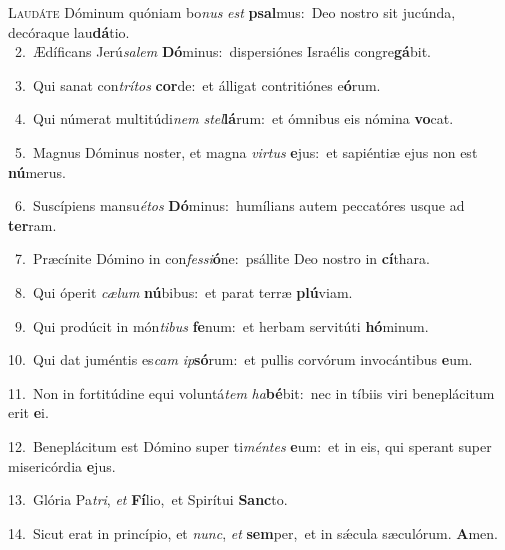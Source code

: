 \lettrine{\initial\textcolor{\initialcolor}{L}}{audáte} Dóminum quóniam bo\textit{nus} \textit{est} \textbf{psal}\-mus:~\star Deo nostro sit jucúnda, decóraque lau\-\textbf{dá}\-tio.\\
{\numbfont\textcolor{\numbcolor}{~2.}}~Ædíficans Jerú\-\textit{sa}\-\textit{lem} \textbf{Dó}\-minus:~\star dispersiónes Israélis congre\-\textbf{gá}\-bit.\par
{\numbfont\textcolor{\numbcolor}{~3.}}~Qui sanat con\-\textit{trí}\-\textit{tos} \textbf{cor}\-de:~\star et álligat contritiónes e\-\textbf{ó}\-rum.\par
{\numbfont\textcolor{\numbcolor}{~4.}}~Qui númerat multitúdi\textit{nem} \textit{stel}\-\textbf{lá}rum:~\star et ómnibus eis nómina \textbf{vo}\-cat.\par
{\numbfont\textcolor{\numbcolor}{~5.}}~Magnus Dóminus noster, et magna \textit{vir}\-\textit{tus} \textbf{e}\-jus:~\star et sapiéntiæ ejus non est \textbf{nú}\-merus.\par
{\numbfont\textcolor{\numbcolor}{~6.}}~Suscípiens mansu\-\textit{é}\-\textit{tos} \textbf{Dó}\-minus:~\star humílians autem peccatóres usque ad \textbf{ter}\-ram.\par
{\numbfont\textcolor{\numbcolor}{~7.}}~Præcínite Dómino in con\-\textit{fes}\-\textit{si}\textbf{ó}ne:~\star psállite Deo nostro in \textbf{cí}\-thara.\par
{\numbfont\textcolor{\numbcolor}{~8.}}~Qui óperit \textit{cæ}\-\textit{lum} \textbf{nú}\-bibus:~\star et parat terræ \textbf{plú}\-viam.\par
{\numbfont\textcolor{\numbcolor}{~9.}}~Qui prodúcit in món\-\textit{ti}\-\textit{bus} \textbf{fe}\-num:~\star et herbam servitúti \textbf{hó}\-minum.\par
{\numbfont\textcolor{\numbcolor}{10.}}~Qui dat juméntis es\textit{cam} \textit{ip}\-\textbf{só}rum:~\star et pullis corvórum invocántibus \textbf{e}\-um.\par
{\numbfont\textcolor{\numbcolor}{11.}}~Non in fortitúdine equi voluntá\textit{tem} \textit{ha}\-\textbf{bé}bit:~\star nec in tíbiis viri beneplácitum erit \textbf{e}\-i.\par
{\numbfont\textcolor{\numbcolor}{12.}}~Beneplácitum est Dómino super ti\-\textit{mén}\-\textit{tes} \textbf{e}\-um:~\star et in eis, qui sperant super misericórdia \textbf{e}\-jus.\par
{\numbfont\textcolor{\numbcolor}{13.}}~Glória Pa\-\textit{tri}\-, \textit{et} \textbf{Fí}\-lio,~\star et Spirítui \textbf{Sanc}\-to.\par
{\numbfont\textcolor{\numbcolor}{14.}}~Sicut erat in princípio, et \textit{nunc}\-, \textit{et} \textbf{sem}\-per,~\star et in sǽcula sæculórum. \textbf{A}\-men.\par
